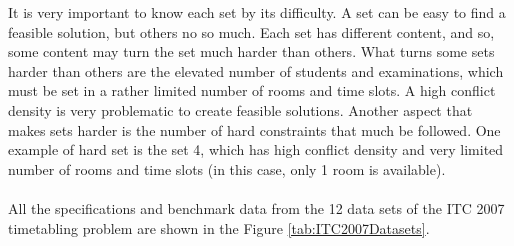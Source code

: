It is very important to know each set by its difficulty. A set can be easy to find a feasible solution, but others no so much. Each set has different content, and so, some content may turn the set much harder than others. What turns some sets harder than others are the elevated number of students and examinations, which must be set in a rather limited number of rooms and time slots. A high conflict density is very problematic to create feasible solutions. Another aspect that makes sets harder is the number of hard constraints that much be followed. One example of hard set is the set 4, which has high conflict density and very limited number of rooms and time slots (in this case, only 1 room is available).\\
\\
All the specifications and benchmark data from the 12 data sets of the ITC 2007 timetabling problem are shown in the Figure \ref{tab:ITC2007Datasets}.

